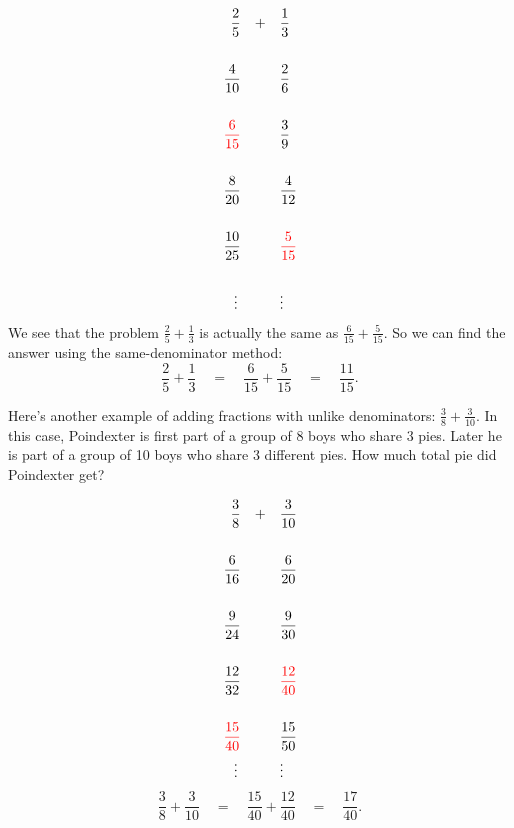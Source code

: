 \begin{align*}
\frac 2 5 \quad + &\quad  \frac 1 3\\
\\
\frac 4{10}\quad \phantom {+} & \quad \frac 2 6\\
\\
{\color{red} \frac 6{15}}\quad \phantom {+} & \quad \frac 3 9\\
\\
\frac 8{20}\quad \phantom {+} & \quad \frac 4 {12}\\
\\
\frac {10}{25}\quad \phantom {+} & \quad {\color{red} \frac 5 {15}}\\
\\
\vdots \qquad &\quad \vdots
\end{align*}
We see that the
problem $\frac 2 5 + \frac 1 3$ 
is actually the same as $\frac 6{15} + \frac5{15}$.  So we can find the answer using the same-denominator method:
\[
\frac 2 5 + \frac 1 3 
\quad = \quad
\frac 6{15} + \frac 5{15}
 \quad = \quad 
 \frac{11}{15}.
\]



\begin{example}
Here's another example of adding fractions with unlike denominators: $\frac 38 + \frac 3{10}$.  In this case, Poindexter is first part of a group of 8 boys who share 3 pies.  Later he is part of a group of 10 boys who share 3 different pies.  How much total pie did Poindexter get?

\begin{align*}
\frac 38 \quad + &\quad  \frac 3{10}\\
\\
\frac 6{16}\quad \phantom {+} & \quad \frac 6 {20}\\
\\
 \frac 9{24}\quad \phantom {+} & \quad \frac 9 {30}\\
\\
\frac {12}{32}\quad \phantom {+} & \quad {\color{red} \frac  {12}{40}}\\
\\
{\color{red} \frac {15}{40}}\quad \phantom {+} & \quad \frac  {15}{50}
\\
\vdots \qquad &\quad \vdots
\end{align*}
\[
\frac 38  +   \frac 3{10} 
\quad = \quad
 \frac{15}{40} + \frac{12}{40} 
 \quad = \quad
  \frac{17}{40}.
\]


\end{example}


